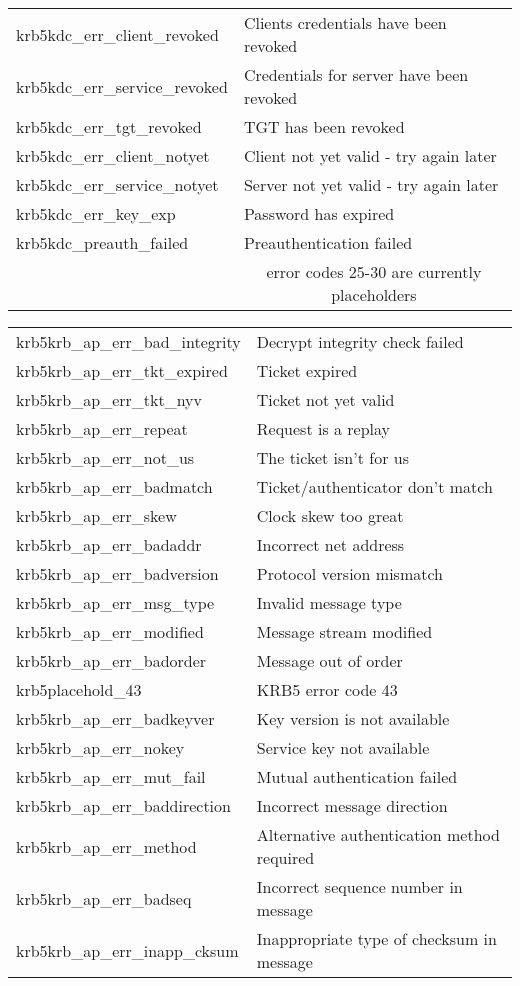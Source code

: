 \begin{small}
\begin{tabular}{ll}
{\sc krb5kdc_err_client_revoked }& Clients credentials have been revoked \\
{\sc krb5kdc_err_service_revoked }& Credentials for server have been revoked \\
{\sc krb5kdc_err_tgt_revoked }& TGT has been revoked \\
{\sc krb5kdc_err_client_notyet }& Client not yet valid - try again later \\
{\sc krb5kdc_err_service_notyet }& Server not yet valid - try again later \\
{\sc krb5kdc_err_key_exp }&  	 Password has expired \\
{\sc krb5kdc_preauth_failed }&  	 Preauthentication failed \\

 & \multicolumn{1}{c}{error codes 25-30 are currently placeholders} \\
\end{tabular}

\begin{tabular}{ll}
{\sc krb5krb_ap_err_bad_integrity }&  Decrypt integrity check failed \\
{\sc krb5krb_ap_err_tkt_expired }& Ticket expired \\
{\sc krb5krb_ap_err_tkt_nyv }& Ticket not yet valid \\
{\sc krb5krb_ap_err_repeat }& Request is a replay \\
{\sc krb5krb_ap_err_not_us }& The ticket isn't for us \\
{\sc krb5krb_ap_err_badmatch }& Ticket/authenticator don't match \\
{\sc krb5krb_ap_err_skew }& Clock skew too great \\
{\sc krb5krb_ap_err_badaddr }& Incorrect net address \\
{\sc krb5krb_ap_err_badversion }& Protocol version mismatch \\
{\sc krb5krb_ap_err_msg_type }& Invalid message type \\
{\sc krb5krb_ap_err_modified }& Message stream modified \\
{\sc krb5krb_ap_err_badorder }& Message out of order \\
{\sc krb5placehold_43 }&	 KRB5 error code 43 \\
{\sc krb5krb_ap_err_badkeyver }& Key version is not available \\
{\sc krb5krb_ap_err_nokey }& Service key not available \\
{\sc krb5krb_ap_err_mut_fail }& Mutual authentication failed \\
{\sc krb5krb_ap_err_baddirection }& Incorrect message direction \\
{\sc krb5krb_ap_err_method }& Alternative authentication method required \\
{\sc krb5krb_ap_err_badseq }& Incorrect sequence number in message \\
{\sc krb5krb_ap_err_inapp_cksum }& Inappropriate type of checksum in message \\ 


\end{tabular}
\end{small}
